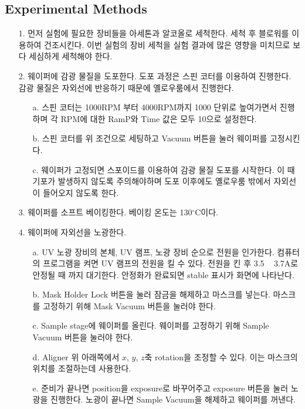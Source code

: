 \documentclass[aps,reprint,superscriptaddress,10pt]{revtex4-2}
\begin{document}
\subsection{Experimental Methods}
\begin{itemize}
  \item[1. ]
  먼저 실험에 필요한 장비들을 아세톤과 알코올로 세척한다. 세척 후 블로워를 이용하여 건조시킨다.
  이번 실험의 장비 세척을 실험 결과에 많은 영향을 미치므로 보다 세심하게 세척해야 한다.
  \item[2. ]
  웨이퍼에 감광 물질을 도포한다. 도포 과정은 스핀 코터를 이용하여 진행한다. 감광 물질은 자외선에
  반응하기 때문에 옐로우룸에서 진행한다. 
  \begin{itemize}
    \item[a. ]  스핀 코터는 1000RPM 부터 4000RPM까지 1000 단위로 
    높여가면서 진행하며 각 RPM에 대한 RamP와 Time 값은 모두 10으로 설정한다. 
    \item[b. ] 스핀 코터를 위 조건으로 세팅하고 Vacuum 버튼을 눌러 웨이퍼를 고정시킨다.
    \item[c. ] 웨이퍼가 고정되면 스포이드를 이용하여 감광 물질 도포를 시작한다. 이 때 기포가 발생하지 않도록
    주의해야하며 도포 이후에도 옐로우룸 밖에서 자외선이 들어오지 않도록 한다.
  \end{itemize}
  \item[3. ]
  웨이퍼를 소프트 베이킹한다. 베이킹 온도는 130{$^\circ$}C이다.
  \item[4. ]
  웨이퍼에 자외선을 노광한다.
  \begin{itemize}
    \item[a. ]
    UV 노광 장비의 본체, UV 램프, 노광 장비 순으로 전원을 인가한다. 
    컴퓨터의 프로그램을 켜면 UV 램프의 전원을 킬 수 있다. 전원을 킨 후
    3.5 ~ 3.7A로 안정될 때 까지 대기한다. 안정화가 완료되면 stable 표시가 화면에 나타난다.
    \item[b. ]
    Mask Holder Lock 버튼을 눌러 잠금을 해제하고 마스크를 넣는다. 마스크를 고정하기 위해 
    Mask Vacuum 버튼을 눌러야 한다.
    \item[c. ]
    Sample stage에 웨이퍼를 올린다. 웨이퍼를 고정하기 위해 Sample Vacuum 버튼을 눌러야 한다.
    \item[d. ]
    Aligner 위 아래쪽에서 $x$, $y$, $z$축 rotation을 조정할 수 있다. 이는 마스크의 위치를
    조절하는데 사용한다.
    \item[e. ]
    준비가 끝나면 position을 exposure로 바꾸어주고 exposure 버튼을 눌러 노광을 진행한다.
    노광이 끝나면 Sample Vacuum을 해제하고 웨이퍼를 꺼낸다.
  \end{itemize}

\end{itemize}
\end{document}
